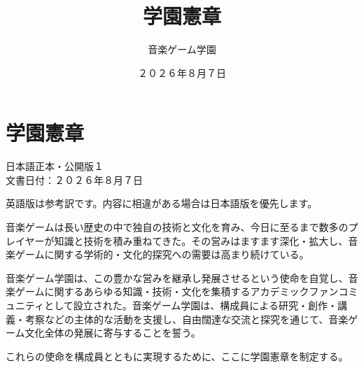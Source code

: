 \documentclass[
  report,
  fontsize   = 12pt,
  paper      = a4,
  head_space = 20mm,
  foot_space = 20mm,
  gutter     = 20mm,
  fore-edge  = 20mm
  ]{jlreq}
\title{学園憲章}
\author{音楽ゲーム学園}
\date{２０２６年８月７日}
\begin{document}
\chapter*{学園憲章}

\begin{flushright}日本語正本・公開版１\\文書日付：２０２６年８月７日\end{flushright}
\noindent 英語版は参考訳です。内容に相違がある場合は日本語版を優先します。

音楽ゲームは長い歴史の中で独自の技術と文化を育み、今日に至るまで数多のプレイヤーが知識と技術を積み重ねてきた。その営みはますます深化・拡大し、音楽ゲームに関する学術的・文化的探究への需要は高まり続けている。

音楽ゲーム学園は、この豊かな営みを継承し発展させるという使命を自覚し、音楽ゲームに関するあらゆる知識・技術・文化を集積するアカデミックファンコミュニティとして設立された。音楽ゲーム学園は、構成員による研究・創作・講義・考察などの主体的な活動を支援し、自由闊達な交流と探究を通じて、音楽ゲーム文化全体の発展に寄与することを誓う。

これらの使命を構成員とともに実現するために、ここに学園憲章を制定する。
\end{document}
